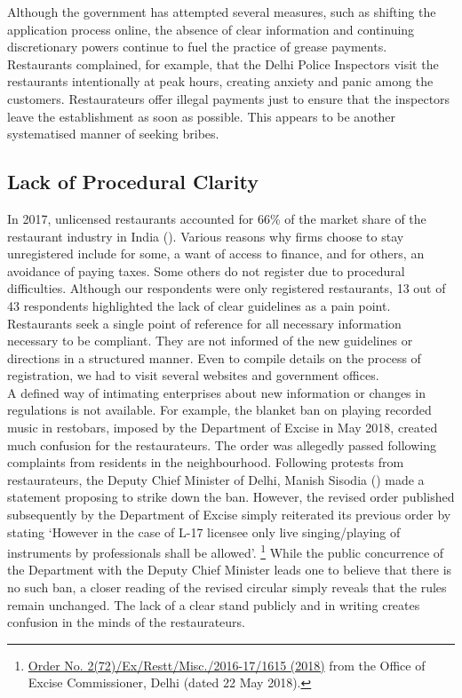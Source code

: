 \documentclass[a4paper, 12pt]{article}
\begin{document}
		Although the government has attempted several measures, such as shifting the application process online, the absence of clear information and continuing discretionary powers continue to fuel the practice of grease payments. Restaurants complained, 
for example, that the Delhi Police Inspectors visit the restaurants intentionally at peak hours, creating anxiety and panic among the customers. Restaurateurs offer illegal payments just to ensure that the inspectors leave the establishment as soon as possible. This 
appears to be another systematised manner of seeking bribes.
				
		\subsection {Lack of Procedural Clarity}
		In 2017, unlicensed restaurants accounted for 66\% of the market share of the restaurant industry in India (\cite{ficci2017foodservindustry}). Various reasons why firms choose to stay unregistered include for some, a want of access to finance, and for others, an avoidance 
of paying taxes. Some others do not register due to procedural difficulties. Although our respondents were only registered restaurants, 13 out of 43 respondents highlighted the lack of clear guidelines as a pain point. Restaurants seek a single point of reference for 
all necessary information necessary to be compliant. They are not informed of the new guidelines or directions in a structured manner. Even to compile details on the process of registration, we had to visit several websites and government offices.\\
		
		A defined way of intimating enterprises about new information or changes in regulations is not available. For example, the blanket ban on playing recorded music in restobars, imposed by the Department of Excise in May 2018, created much confusion 
for the restaurateurs. The order was allegedly passed following complaints from residents in the neighbourhood. Following protests from restaurateurs, the Deputy Chief Minister of Delhi, Manish Sisodia (\cite{hindu2018recordedmusicnoban}) made a statement proposing to strike down 
the ban. However, the revised order published subsequently by the Department of Excise simply reiterated its previous order by stating ‘However in the case of L-17 licensee only live singing/playing of instruments by professionals shall be allowed’.
\footnote{\href{https://bit.ly/2QxMK56}{Order No. 2(72)/Ex/Restt/Misc./2016-17/1615 (2018)} from the Office of Excise Commissioner, Delhi (dated 22 May 2018).}  While the public concurrence of the Department with the Deputy Chief Minister leads one to believe 
that there is no such ban, a closer reading of the revised circular simply reveals that the rules remain unchanged. The lack of a clear stand publicly and in writing creates confusion in the minds of the restaurateurs. \\
		
\end{document}

